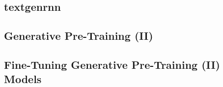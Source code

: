 
\subsection{textgenrnn}\label{sec:text-generation:textgenrnn}
\subsection{Generative Pre-Training (II)}\label{sec:text-generation:gpt-2}
\subsection{Fine-Tuning Generative Pre-Training (II) Models}\label{sec:text-generation-fine-tuning-gpt-2}


